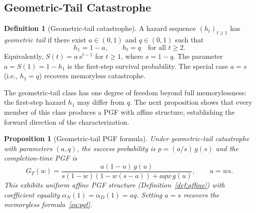\documentclass[11pt]{article}
\theoremstyle{plain}
\newtheorem{proposition}[theorem]{Proposition}
\theoremstyle{definition}
\newtheorem{definition}[theorem]{Definition}
\theoremstyle{remark}
\begin{document}
\subsection{Geometric-Tail Catastrophe}\label{sec:geom-tail}

\begin{definition}[Geometric-tail catastrophe]\label{def:geom-tail}
A hazard sequence $(h_t)_{t \geq 1}$ has \emph{geometric tail} if there exist $a \in (0,1)$ and $q \in (0,1)$ such that
\[
  h_1 = 1-a, \qquad h_t = q \quad \text{for all } t \geq 2.
\]
Equivalently, $S(t) = a\,s^{t-1}$ for $t \geq 1$, where $s = 1-q$.  The parameter $a = S(1) = 1-h_1$ is the first-step survival probability.  The special case $a = s$ (i.e., $h_1 = q$) recovers memoryless catastrophe.
\end{definition}

The geometric-tail class has one degree of freedom beyond full memorylessness: the first-step hazard $h_1$ may differ from $q$.  The next proposition shows that every member of this class produces a PGF with affine structure, establishing the forward direction of the characterization.

\begin{proposition}[Geometric-tail PGF formula]\label{prop:geom-tail-pgf}
Under geometric-tail catastrophe with parameters $(a, q)$, the success probability is $p = (a/s)\,g(s)$ and the completion-time PGF is
\begin{equation}\label{eq:geom-tail-pgf}
  G_T(w) = \frac{a(1-u)\,g(u)}{s(1-w)(1 - w(s-a)) + aqw\,g(u)}, \qquad u = ws.
\end{equation}
This exhibits uniform affine PGF structure (Definition~\ref{def:affine}) with coefficient equality $\alpha_N(1) = \alpha_D(1) = aq$.  Setting $a = s$ recovers the memoryless formula~\eqref{eq:pgf}.
\end{proposition}
\end{document}
